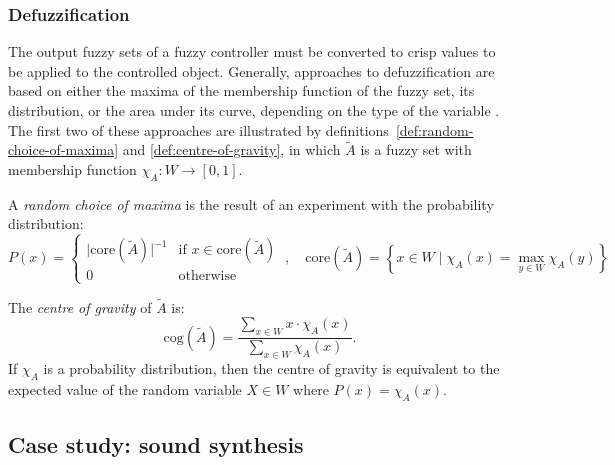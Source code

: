 \subsubsection{Defuzzification}
\label{q1:defuzzification}

The output fuzzy sets of a fuzzy controller must be converted to crisp values to be
applied to the controlled object.
Generally, approaches to defuzzification are based on either the maxima of the
membership function of the fuzzy set, its distribution, or the area under its curve,
depending on the type of the variable \parencite[166-172]{Leekwijck1999}.
The first two of these approaches are illustrated by
definitions~\ref{def:random-choice-of-maxima} and \ref{def:centre-of-gravity}, in which
$\tilde{A}$ is a fuzzy set with membership function $\chi_A : W \to \left[0, 1\right]$.

\begin{definition}
  \label{def:random-choice-of-maxima}
  A \emph{random choice of maxima} is the result of an experiment with the
  probability distribution:
  \begin{equation}
    P(x) =
    \begin{cases}
      \lvert \text{core}(\tilde{A}) \rvert^{-1} & \text{if } x \in \text{core}(\tilde{A})
      \\
      0                                         & \text{otherwise}
    \end{cases}
    \ ,\quad
    \text{core}(\tilde{A}) = \left\{x \in W \mid \chi_A(x) = \max_{y \in W} \chi_A(y)\right\}
  \end{equation}
\end{definition}

\begin{definition}
  \label{def:centre-of-gravity}
  The \emph{centre of gravity} of $\tilde{A}$ is:
  \begin{equation}
    \text{cog}(\tilde{A}) = \frac{\sum_{x \in W} x \cdot \chi_A(x)}{\sum_{x \in W} \chi_A(x)}.
  \end{equation}
  If $\chi_A$ is a probability distribution, then the centre of gravity is equivalent to
  the expected value of the random variable $X \in W$ where $P(x) = \chi_A(x)$.
\end{definition}

\subsection{Case study: sound synthesis}
\label{q1:sound-synthesis}

